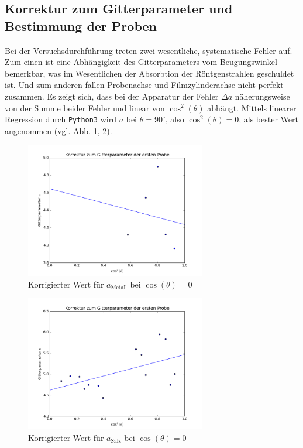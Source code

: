 \subsection{Korrektur zum Gitterparameter und Bestimmung der Proben}
Bei der Versuchsdurchführung treten zwei wesentliche, systematische Fehler auf. Zum einen ist eine Abhängigkeit des Gitterparameters vom Beugungswinkel
bemerkbar,
was im Wesentlichen der Absorbtion der Röntgenstrahlen geschuldet ist. Und zum anderen fallen Probenachse und Filmzylinderachse nicht perfekt zusammen.
Es zeigt sich, dass bei der Apparatur der Fehler $\Delta a$ näherungsweise von der Summe beider Fehler und linear von $\cos^2(\theta)$ abhängt. Mittels
linearer Regression durch \texttt{Python3} wird $a$ bei $\theta = 90^\circ$, also $\cos^2(\theta)=0$, als bester Wert angenommen (vgl. Abb. \ref{pic:fita1}, \ref{pic:fita2}). 


\begin{figure}[H]
	\includegraphics[width=0.7\textwidth]{../auswertung/metall.png}
	\caption{Korrigierter Wert für $a_\text{Metall}$ bei $\cos(\theta)=0$}
	\label{pic:fita1}
\end{figure}

\begin{figure}[H]
	\includegraphics[width=0.7\textwidth]{../auswertung/salz.png}
	\caption{Korrigierter Wert für $a_\text{Salz}$ bei $\cos(\theta)=0$}
	\label{pic:fita2}
\end{figure}

